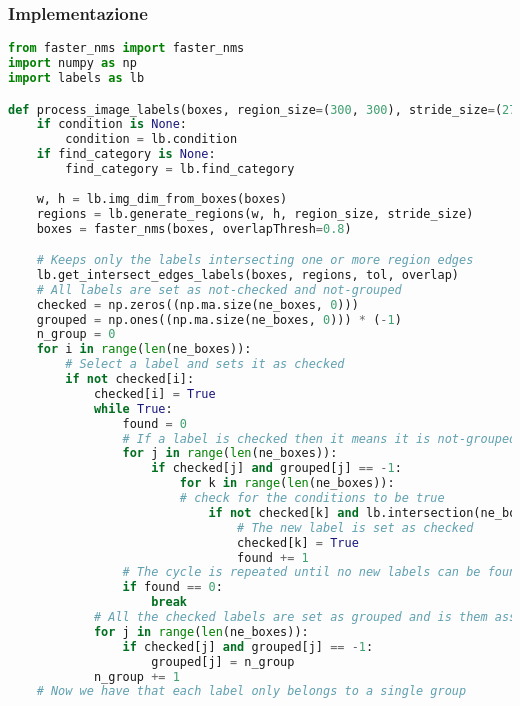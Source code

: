 \subsubsection{Implementazione}
\begin{lstlisting}[language=Python, caption=Python example]
from faster_nms import faster_nms
import numpy as np
import labels as lb

def process_image_labels(boxes, region_size=(300, 300), stride_size=(270, 270), overlap=(0, 0), tol=0, condition=None, find_category=None):
    if condition is None:
        condition = lb.condition
    if find_category is None:
        find_category = lb.find_category
        
    w, h = lb.img_dim_from_boxes(boxes)
    regions = lb.generate_regions(w, h, region_size, stride_size)
    boxes = faster_nms(boxes, overlapThresh=0.8)

    # Keeps only the labels intersecting one or more region edges
    lb.get_intersect_edges_labels(boxes, regions, tol, overlap)
    # All labels are set as not-checked and not-grouped
    checked = np.zeros((np.ma.size(ne_boxes, 0)))
    grouped = np.ones((np.ma.size(ne_boxes, 0))) * (-1)
    n_group = 0
    for i in range(len(ne_boxes)):
        # Select a label and sets it as checked
        if not checked[i]:
            checked[i] = True
            while True:
                found = 0
                # If a label is checked then it means it is not-grouped
                for j in range(len(ne_boxes)):
                    if checked[j] and grouped[j] == -1:
                        for k in range(len(ne_boxes)):
                        # check for the conditions to be true
                            if not checked[k] and lb.intersection(ne_boxes[j, :], ne_boxes[k, :], tol) and condition(ne_boxes[j, :], ne_boxes[k, :]) and lb.intersect_common_edge(ne_boxes[j, :], ne_boxes[k, :], regions, tol, overlap) and lb.matched(ne_boxes[j, :], ne_boxes[k, :]) and not lb.belong_same_region_strict_group(ne_boxes[k, :], checked_boxes, regions, tol):
                                # The new label is set as checked
                                checked[k] = True
                                found += 1
                # The cycle is repeated until no new labels can be found
                if found == 0:
                    break
            # All the checked labels are set as grouped and is them assigned a number with the purpose of identify their group ID
            for j in range(len(ne_boxes)):
                if checked[j] and grouped[j] == -1:
                    grouped[j] = n_group
            n_group += 1
    # Now we have that each label only belongs to a single group


\end{lstlisting}
